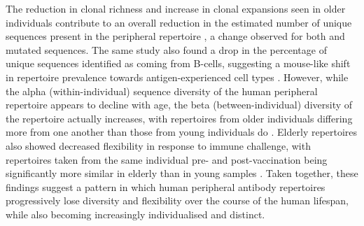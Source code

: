 The reduction in clonal richness and increase in clonal expansions seen in older individuals contribute to an overall reduction in the estimated number of unique sequences present in the peripheral repertoire \parencite{debourcy2017ageing}, a change observed for both \naive and mutated sequences. The same study also found a drop in the percentage of unique sequences identified as coming from \naive B-cells, suggesting a mouse-like shift in repertoire prevalence towards antigen-experienced cell types \parencite{debourcy2017ageing}. However, while the alpha (within-individual) sequence diversity of the human peripheral repertoire appears to decline with age, the beta (between-individual) diversity of the repertoire actually increases, with repertoires from older individuals differing more from one another than those from young individuals do \parencite{debourcy2017ageing}. Elderly repertoires also showed decreased flexibility in response to immune challenge, with repertoires taken from the same individual pre- and post-vaccination being significantly more similar in elderly than in young samples \parencite{debourcy2017ageing}. Taken together, these findings suggest a pattern in which human peripheral antibody repertoires progressively lose diversity and flexibility over the course of the human lifespan, while also becoming increasingly individualised and distinct.

